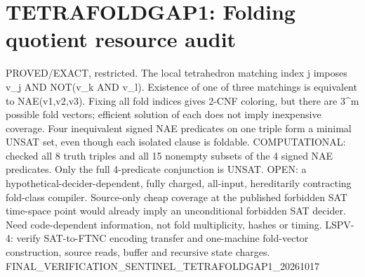 \section*{TETRAFOLDGAP1: Folding quotient resource audit}
PROVED/EXACT, restricted. The local tetrahedron matching index j imposes v_j AND NOT(v_k AND v_l). Existence of one of three matchings is equivalent to NAE(v1,v2,v3). Fixing all fold indices gives 2-CNF coloring, but there are 3^m possible fold vectors; efficient solution of each does not imply inexpensive coverage. Four inequivalent signed NAE predicates on one triple form a minimal UNSAT set, even though each isolated clause is foldable.
COMPUTATIONAL: checked all 8 truth triples and all 15 nonempty subsets of the 4 signed NAE predicates. Only the full 4-predicate conjunction is UNSAT.
OPEN: a hypothetical-decider-dependent, fully charged, all-input, hereditarily contracting fold-class compiler. Source-only cheap coverage at the published forbidden SAT time-space point would already imply an unconditional forbidden SAT decider. Need code-dependent information, not fold multiplicity, hashes or timing.
LSPV-4: verify SAT-to-FTNC encoding transfer and one-machine fold-vector construction, source reads, buffer and recursive state charges.
FINAL_VERIFICATION_SENTINEL_TETRAFOLDGAP1_20261017